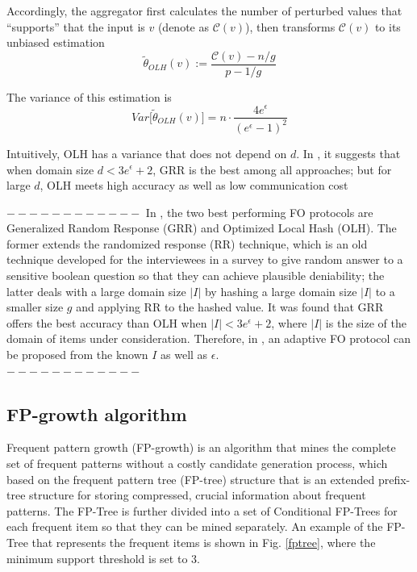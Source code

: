 \documentclass[conference]{IEEEtran}
\begin{document}
Accordingly, the aggregator first calculates the number of perturbed values that ``supports'' that the input is $v$ (denote as $\mathcal{C}(v)$), then transforms $\mathcal{C}(v)$ to its unbiased estimation
\begin{equation}
\tilde{\theta}_{OLH}(v) := \frac{\mathcal{C}(v) - n/g}{p-1/g}
\label{olh aggregate}
\end{equation}

The variance of this estimation is 
\begin{equation}
Var\big[\tilde{\theta}_{OLH}(v)\big] =n \cdot \frac{4e^{\epsilon}}{{(e^{\epsilon}-1)}^2}
\label{olh variance}
\end{equation}

Intuitively, OLH has a variance that does not depend on $d$. In \cite{a8}, it suggests that when domain size $d<3e^{\epsilon} +2$, GRR is the best among all approaches; but for large $d$, OLH meets high accuracy as well as low communication cost


$------------$
{\color{red}In \cite{a8}, the two best performing FO protocols are Generalized Random Response (GRR) and Optimized Local Hash (OLH). The former extends the randomized response (RR) technique\cite{rr}, which is an old technique developed for the interviewees in a survey to give random answer to a sensitive boolean question so that they can achieve plausible deniability; the latter deals with a large domain size $|I|$ by hashing a large domain size $|I|$ to a smaller size $g$ and applying RR to the hashed value. It was found that GRR offers the best accuracy than OLH when $|I| < 3e^{\epsilon} + 2$, where $|I|$ is the size of the domain of items under consideration. Therefore, in  \cite{a2}, an adaptive FO protocol can be proposed from the known $I$ as well as $\epsilon$.\\}
$------------$

\subsection{FP-growth algorithm}
Frequent pattern growth (FP-growth)\cite{fp} is an algorithm that mines the complete set of frequent patterns without a costly candidate generation process, which based on the frequent pattern tree (FP-tree) structure that is an extended prefix-tree structure for storing compressed, crucial information about frequent patterns. The FP-Tree is further divided into a set of Conditional FP-Trees for each frequent item so that they can be mined separately. An example of the FP-Tree that represents the frequent items is shown in Fig. \ref{fptree}, where the minimum support threshold is set to 3.
\end{document}
